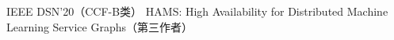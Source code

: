 \cvpub
{IEEE DSN'20（CCF-B类）} %
{HAMS: High Availability for Distributed Machine Learning Service Graphs（第三作者）} %
{} %
{} %
{ %
}
